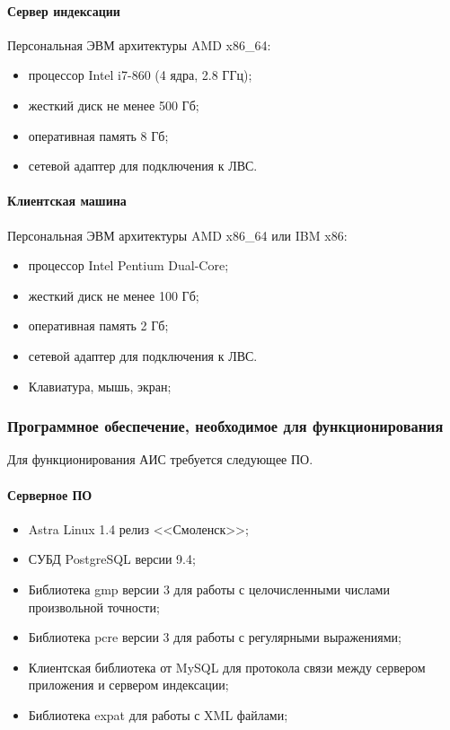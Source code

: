 \paragraph*{Сервер индексации} \hfill

Персональная ЭВМ архитектуры AMD x86\_64:
\begin{itemize}
\item процессор Intel i7-860 (4 ядра, 2.8 ГГц);
\item жесткий диск не менее 500 Гб;
\item оперативная память 8 Гб;
\item сетевой адаптер для подключения к ЛВС.
\end{itemize}

\paragraph*{Клиентская машина} \hfill

Персональная ЭВМ архитектуры AMD x86\_64 или IBM x86:
\begin{itemize}
\item процессор Intel Pentium Dual-Core;
\item жесткий диск не менее 100 Гб;
\item оперативная память 2 Гб;
\item сетевой адаптер для подключения к ЛВС.
\item Клавиатура, мышь, экран;
\end{itemize}


\subsubsection{Программное обеспечение, необходимое для функционирования}

Для функционирования АИС требуется следующее ПО.

\paragraph*{Серверное ПО} \hfill

\begin{itemize}
\item Astra Linux 1.4 релиз <<Смоленск>>;
\item СУБД PostgreSQL версии 9.4;
\item Библиотека gmp версии 3 для работы с целочисленными числами произвольной точности;
\item Библиотека pcre версии 3 для работы с регулярными выражениями;
\item Клиентская библиотека от MySQL для протокола связи между сервером приложения и сервером индексации;
\item Библиотека expat для работы с XML файлами;
\end{itemize}

